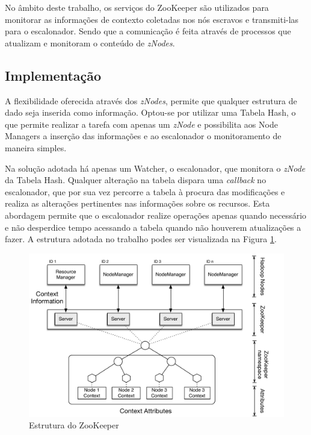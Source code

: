 No âmbito deste trabalho, os serviços do ZooKeeper são utilizados para monitorar as informações de contexto coletadas nos nós escravos e transmiti-las para o escalonador. Sendo que a comunicação é feita através de processos que atualizam e monitoram o conteúdo de \textit{zNodes}.

\subsection{Implementação}
A flexibilidade oferecida através dos \textit{zNodes}, permite que qualquer estrutura de dado seja inserida como informação. Optou-se por utilizar uma Tabela Hash, o que permite realizar a tarefa com apenas um \textit{zNode} e possibilita aos Node Managers a inserção das informações e ao escalonador o monitoramento de maneira simples.

Na solução adotada há apenas um Watcher, o escalonador, que monitora o \textit{zNode} da Tabela Hash. Qualquer alteração na tabela dispara uma \textit{callback} no escalonador, que por sua vez percorre a tabela à procura das modificações e realiza as alterações pertinentes nas informações sobre os recursos. Esta abordagem permite que o escalonador realize operações apenas quando necessário e não desperdice tempo acessando a tabela quando não houverem atualizações a fazer.
A estrutura adotada no trabalho podes ser visualizada na Figura \ref{fig:zk}.

\begin{figure}[!hbtn]
   \centering
   \includegraphics[width=15cm]{figuras/Zookeeper.pdf}
   \caption{Estrutura do ZooKeeper}
   \label{fig:zk}
\end{figure}

